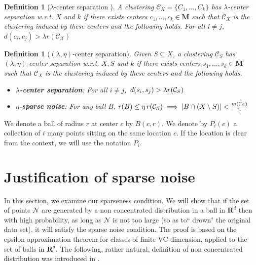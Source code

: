 \documentclass[12pt]{article}
\newtheorem{definition}[theorem]{Definition}
\newcommand{\mc}{\mathcal}
\newcommand{\mb}{\mathbf}
\begin{document}
\begin{definition}[$\lambda$-center separation \cite{ben2014clustering}]
\label{defn:lambdacs}
A clustering $\mc C_{X} = \{C_1, \ldots, C_k\}$ has $\lambda$-center separation w.r.t. $X$ and $k$ if there exists centers $c_1, \ldots, c_k \in \mb M$ such that $\mc C_{X}$ is the clustering induced by these centers and the following holds. For all $i\neq j$, $d(c_i, c_j) > \lambda r(\mc{C}_{\mc{X}})$
\end{definition}

\begin{definition}[$(\lambda, \eta)$-center separation]
Given $S \subseteq X$, a clustering $\mc C_{S}$ has $(\lambda, \eta)$-center separation w.r.t. $X, S$ and $k$ if there exists centers $s_1, \ldots, s_k \in \mb M$ such that $\mc C_{X}$ is the clustering induced by these centers and the following holds.

\begin{itemize}[nolistsep, noitemsep]
\label{defn:lambdacsnoise}	

\item[$\diamond$] {\bf $\lambda$-center separation}: For all $i\neq j$, $\thinspace d(s_i, s_j) > \lambda r({\mc C}_{S})$
\item[$\diamond$]{\bf $\eta$-sparse noise}: For any ball $B$, $r(B)\leq \eta \thinspace r(\mc{C}_{S}) \implies |B\cap (X\setminus S)| < \frac{m(\mc C_{S})}{2}$
\end{itemize}
\end{definition}

We denote a ball of radius $r$ at center $c$ by $B(c, r)$. We denote by $P_{i}(c)$ a collection of $i$ many points sitting on the same location $c$. If the location is clear from the context, we will use the notation $P_i$.



\section{Justification of sparse noise}
\label{Noise_justify}
In this section, we examine our sparseness condition. We will show that if the set of points $\mc N$ are generated by a non concentrated distribution in a ball in $\mb R^d$ then with high probability, as long as $\mc N$ is not too large (so as to``
drown" the original data set), it will satisfy the sparse noise condition. The proof is based on the epsilon approximation theorem for classes of finite VC-dimension, applied to the set of balls in $\mb R^d$. The following, rather natural, definition of non concentrated distribution was introduced in \cite{balcan2012distributed}.
\end{document}
